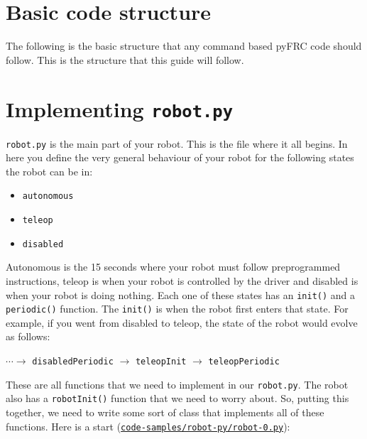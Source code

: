 \documentclass[12pt]{article}
\begin{document}
\newpage
\section{Basic code structure}
The following is the basic structure that any command based pyFRC code should follow. This is the structure that this guide will follow.
\label{fig:basic-code-structure}

\section{Implementing \texttt{robot.py}}
\texttt{robot.py} is the main part of your robot. This is the file where it all begins. In here you define the very general behaviour of your robot for the following states the robot can be in:
\begin{itemize}
    \item \texttt{autonomous}
    \item \texttt{teleop}
    \item \texttt{disabled}
\end{itemize}
Autonomous is the 15 seconds where your robot must follow preprogrammed instructions, teleop is when your robot is controlled by the driver and disabled is when your robot is doing nothing. Each one of these states has an \texttt{init()} and a \texttt{periodic()} function. The \texttt{init()} is when the robot first enters that state. For example, if you went from disabled to teleop, the state of the robot would evolve as follows:

\begin{center}\(\cdots \rightarrow\) \texttt{disabledPeriodic} \(\rightarrow\) \texttt{teleopInit} \(\rightarrow\) \texttt{teleopPeriodic}
\end{center}

These are all functions that we need to implement in our \texttt{robot.py}. The robot also has a \texttt{robotInit()} function that we need to worry about. So, putting this together, we need to write some sort of class that implements all of these functions. Here is a start (\href{https://github.com/PaulVirally/Guide-to-pyFRC/blob/master/code-samples/robot-py/robot-0.py}{\texttt{code-samples/robot-py/robot-0.py}}):
\inputminted[breaklines,bgcolor=bg,frame=lines,framesep=2mm]{python}{code-samples/robot-py/robot-0.py}
\end{document}
